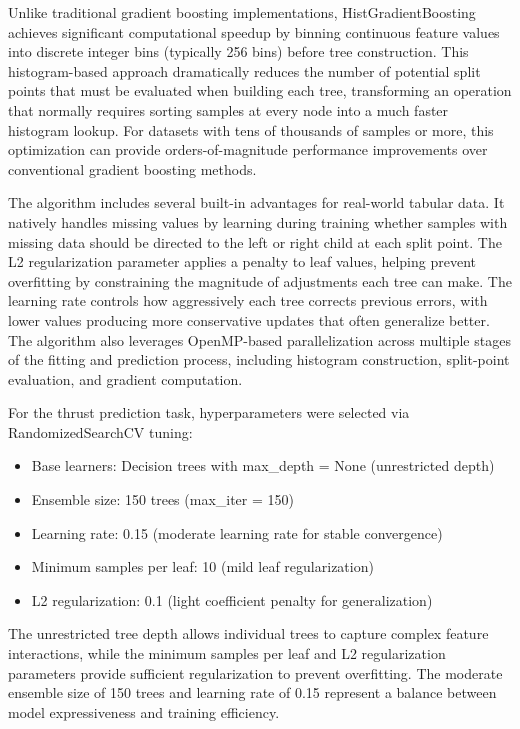 \documentclass[12pt,a4paper]{article}
\begin{document}
Unlike traditional gradient boosting implementations, HistGradientBoosting achieves significant computational speedup by binning continuous feature values into discrete integer bins (typically 256 bins) before tree construction. This histogram-based approach dramatically reduces the number of potential split points that must be evaluated when building each tree, transforming an operation that normally requires sorting samples at every node into a much faster histogram lookup. For datasets with tens of thousands of samples or more, this optimization can provide orders-of-magnitude performance improvements over conventional gradient boosting methods.

The algorithm includes several built-in advantages for real-world tabular data. It natively handles missing values by learning during training whether samples with missing data should be directed to the left or right child at each split point. The L2 regularization parameter applies a penalty to leaf values, helping prevent overfitting by constraining the magnitude of adjustments each tree can make. The learning rate controls how aggressively each tree corrects previous errors, with lower values producing more conservative updates that often generalize better. The algorithm also leverages OpenMP-based parallelization across multiple stages of the fitting and prediction process, including histogram construction, split-point evaluation, and gradient computation.

For the thrust prediction task, hyperparameters were selected via RandomizedSearchCV tuning:

\begin{itemize}
    \item Base learners: Decision trees with max\_depth = None (unrestricted depth)
    \item Ensemble size: 150 trees (max\_iter = 150)
    \item Learning rate: 0.15 (moderate learning rate for stable convergence)
    \item Minimum samples per leaf: 10 (mild leaf regularization)
    \item L2 regularization: 0.1 (light coefficient penalty for generalization)
\end{itemize}

The unrestricted tree depth allows individual trees to capture complex feature interactions, while the minimum samples per leaf and L2 regularization parameters provide sufficient regularization to prevent overfitting. The moderate ensemble size of 150 trees and learning rate of 0.15 represent a balance between model expressiveness and training efficiency.
\end{document}
